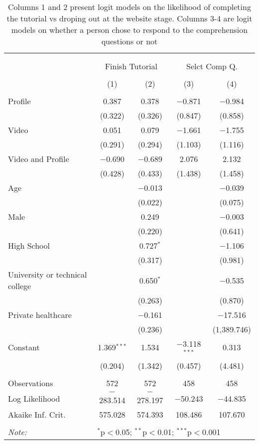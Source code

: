 
\begin{table}[H] \centering 
  \caption{Columns 1 and 2 present logit models on the likelihood of completing the tutorial vs droping out at the website stage. Columns 3-4 are logit models on whether a 
          person chose to respond to the comprehension questions or not} 
  \label{tbl:attrition} 
\begin{tabular}{@{\extracolsep{5pt}}lcccc} 
\\[-1.8ex]\hline 
\hline \\[-1.8ex] 
\\[-1.8ex] & \multicolumn{2}{c}{Finish Tutorial} & \multicolumn{2}{c}{Selct Comp Q.} \\ 
\\[-1.8ex] & (1) & (2) & (3) & (4)\\ 
\hline \\[-1.8ex] 
 Profile & 0.387 & 0.378 & $-$0.871 & $-$0.984 \\ 
  & (0.322) & (0.326) & (0.847) & (0.858) \\ 
  Video & 0.051 & 0.079 & $-$1.661 & $-$1.755 \\ 
  & (0.291) & (0.294) & (1.103) & (1.116) \\ 
  Video and Profile & $-$0.690 & $-$0.689 & 2.076 & 2.132 \\ 
  & (0.428) & (0.433) & (1.438) & (1.458) \\ 
  Age &  & $-$0.013 &  & $-$0.039 \\ 
  &  & (0.022) &  & (0.075) \\ 
  Male &  & 0.249 &  & $-$0.003 \\ 
  &  & (0.220) &  & (0.641) \\ 
  High School &  & 0.727$^{*}$ &  & $-$1.106 \\ 
  &  & (0.317) &  & (0.981) \\ 
  University or technical college &  & 0.650$^{*}$ &  & $-$0.535 \\ 
  &  & (0.263) &  & (0.870) \\ 
  Private healthcare &  & $-$0.161 &  & $-$17.516 \\ 
  &  & (0.236) &  & (1,389.746) \\ 
  Constant & 1.369$^{***}$ & 1.534 & $-$3.118$^{***}$ & 0.313 \\ 
  & (0.204) & (1.342) & (0.457) & (4.481) \\ 
 \hline \\[-1.8ex] 
Observations & 572 & 572 & 458 & 458 \\ 
Log Likelihood & $-$283.514 & $-$278.197 & $-$50.243 & $-$44.835 \\ 
Akaike Inf. Crit. & 575.028 & 574.393 & 108.486 & 107.670 \\ 
\hline 
\hline \\[-1.8ex] 
\textit{Note:}  & \multicolumn{4}{l}{$^{*}$p$<$0.05; $^{**}$p$<$0.01; $^{***}$p$<$0.001} \\ 
\end{tabular} 
\end{table} 
